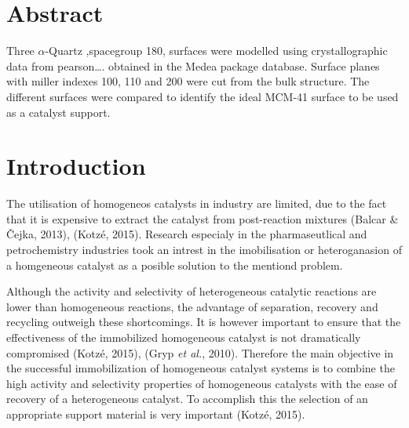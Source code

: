 \documentclass[]{article}
\let\oldsubparagraph\subparagraph
\renewcommand{\subparagraph}[1]{\oldsubparagraph{#1}\mbox{}}
\begin{document}
\hypertarget{section-5}{%
\subparagraph{}\label{section-5}}

\hypertarget{section-6}{%
\subparagraph{}\label{section-6}}

\hypertarget{abstract}{%
\section{Abstract}\label{abstract}}

Three \(\alpha\)-Quartz ,spacegroup 180, surfaces were modelled using
crystallographic data from pearson\ldots{}. obtained in the Medea
package database. Surface planes with miller indexes 100, 110 and 200
were cut from the bulk structure. The different surfaces were compared
to identify the ideal MCM-41 surface to be used as a catalyst support.

\hypertarget{introduction-1}{%
\section{Introduction}\label{introduction-1}}

The utilisation of homogeneos catalysts in industry are limited, due to
the fact that it is expensive to extract the catalyst from post-reaction
mixtures (Balcar \& Čejka, 2013), (Kotzé, 2015). Research especialy in
the pharmaseutlical and petrochemistry industries took an intrest in the
imobilisation or heteroganasion of a homgeneous catalyst as a posible
solution to the mentiond problem.

Although the activity and selectivity of heterogeneous catalytic
reactions are lower than homogeneous reactions, the advantage of
separation, recovery and recycling outweigh these shortcomings. It is
however important to ensure that the effectiveness of the immobilized
homogeneous catalyst is not dramatically compromised (Kotzé, 2015),
(Gryp \emph{et al.}, 2010). Therefore the main objective in the
successful immobilization of homogeneous catalyst systems is to combine
the high activity and selectivity properties of homogeneous catalysts
with the ease of recovery of a heterogeneous catalyst. To accomplish
this the selection of an appropriate support material is very important
(Kotzé, 2015).
\end{document}
